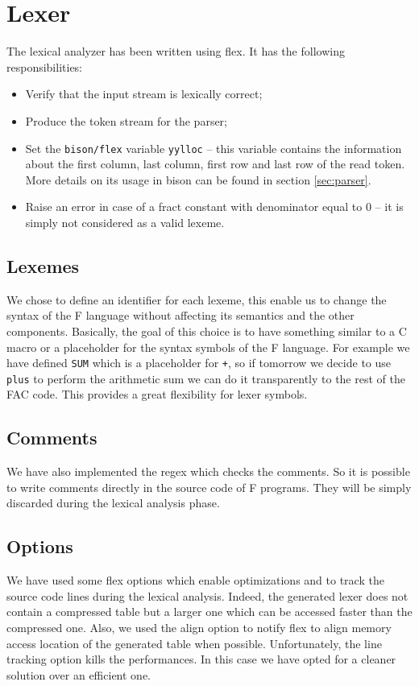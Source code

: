 \section{Lexer}
The lexical analyzer has been written using flex.
It has the following responsibilities:
\begin{itemize}
\item Verify that the input stream is lexically correct;
\item Produce the token stream for the parser;
\item Set the \verb|bison/flex| variable \verb|yylloc| -- this
variable contains the information about the first column, last column,
first row and last row of the read token. More details on its usage in
bison can be found in section \ref{sec:parser}.
\item Raise an error in case of a fract constant with denominator equal
to $0$ -- it is simply not considered as a valid lexeme.
\end{itemize}

\subsection{Lexemes}
We chose to define an identifier for each lexeme, this enable us to change the
syntax of the F language without affecting its semantics and the other
components. Basically, the goal of this choice is to have something similar to
a C macro or a placeholder for the syntax symbols of the F language.
For example we have defined \verb|SUM| which is a placeholder for \verb|+|, so
if tomorrow we decide to use \verb|plus| to perform the arithmetic sum we can do
it transparently to the rest of the FAC code. This provides a great flexibility
for lexer symbols.

\subsection{Comments}
We have also implemented the regex which checks the comments. So it is possible
to write comments directly in the source code of F programs. They will be simply
 discarded during the lexical analysis phase.

\subsection{Options}
We have used some flex options which enable optimizations
and to track the source code lines during the lexical analysis. Indeed, the
generated lexer does not contain a compressed table but a larger one which can
be accessed faster than the compressed one. Also, we used the align option to
notify flex to align memory access location of the generated table when
possible. Unfortunately, the line tracking option kills the performances.
In this case we have opted for a cleaner solution over an efficient one.

